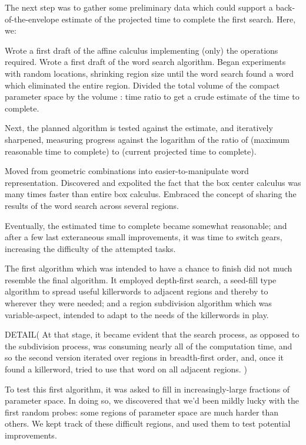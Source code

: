 The next step was to gather some preliminary data which could support a back-of-the-envelope
estimate of the projected time to complete the first search. Here, we:
\begin{itemize}
   Wrote a first draft of the affine calculus implementing (only) the operations required.
   Wrote a first draft of the word search algorithm.
   Began experiments with random locations, shrinking region size until the word search found a word which eliminated the entire region.
   Divided the total volume of the compact parameter space by the volume : time ratio to get a crude estimate of the time to complete.
\end{itemize}

Next, the planned algorithm is tested against the estimate, and iteratively sharpened,
measuring progress against the logarithm of the ratio of (maximum reasonable time to complete) to (current projected time to complete).
\begin{itemize}
  Moved from geometric combinations into easier-to-manipulate word representation.
  Discovered and expolited the fact that the box center calculus was many times faster than entire box calculus.
  Embraced the concept of sharing the results of the word search across several regions.
\end{itemize}

Eventually, the estimated time to complete became somewhat reasonable;
and after a few last exteraneous small improvements, it was time to switch gears, increasing the difficulty of the attempted tasks.

The first algorithm which was intended to have a chance to finish did not much resemble the final algorithm. It employed depth-first search, a seed-fill type algorithm to spread useful killerwords to adjacent regions and thereby to wherever they were needed; and a region subdivision algorithm which was variable-aspect, intended to adapt to the needs of the killerwords in play.

DETAIL(
At that stage, it became evident that the search process, as 
opposed to the subdivision process, 
was consuming nearly all of the computation time, and so the second 
version iterated over regions in breadth-first order, and, once it 
found a killerword, tried to use that word on all adjacent regions.
)

To test this first algorithm, it was asked to fill in increasingly-large fractions of parameter space. In doing so, we discovered that we'd been mildly lucky with the first random probes: some regions of parameter space are much harder than others. We kept track of these difficult regions, and used them to test potential improvements.

